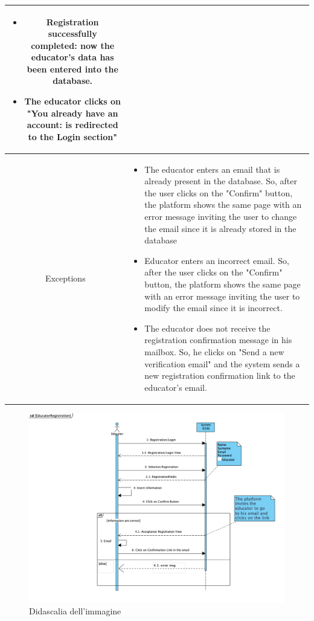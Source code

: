 \begin{longtable}{|c| p{10cm}|}
\begin{itemize}
\item Registration successfully completed: now the educator's data has been entered into the database.
\item The educator clicks on "You already have an account: is redirected to the Login section"
\end{itemize}\\
\hline
Exceptions &
\begin{itemize}
\item The educator enters an email that is already present in the database. So, after the user clicks on the "Confirm" button, the platform shows the same page with an error message inviting the user to change the email since it is already stored in the database
\item Educator enters an incorrect email. So, after the user clicks on the "Confirm" button, the platform shows the same page with an error message inviting the user to modify the email since it is incorrect.
\item The educator does not receive the registration confirmation message in his mailbox. So, he clicks on "Send a new verification email" and the system sends a new registration confirmation link to the educator's email.
\end{itemize}\\
\hline
\end{longtable}

    \begin{figure}[H]
  \includegraphics[width=1\linewidth]{SequenceDiagram/EducatorReg.png} 
  \caption{Didascalia dell'immagine}
  \label{fig:immagine}
\end{figure}




